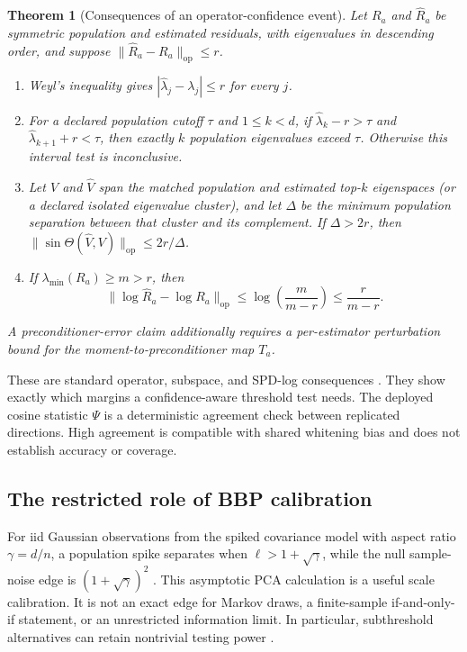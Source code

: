 \documentclass[11pt]{article}
\theoremstyle{plain}
\newtheorem{theorem}{Theorem}
\theoremstyle{definition}
\theoremstyle{remark}
\newcommand{\op}{\mathrm{op}}
\begin{document}
\begin{theorem}[Consequences of an operator-confidence event]\label{thm:operator}
Let $R_a$ and $\widehat R_a$ be symmetric population and estimated residuals,
with eigenvalues in descending order, and suppose
$\|\widehat R_a-R_a\|_{\op}\le r$.
\begin{enumerate}
\item Weyl's inequality gives
  $|\widehat\lambda_j-\lambda_j|\le r$ for every $j$.
\item For a declared population cutoff $\tau$ and $1\le k<d$, if
  $\widehat\lambda_k-r>\tau$ and
  $\widehat\lambda_{k+1}+r<\tau$, then exactly $k$ population eigenvalues
  exceed $\tau$. Otherwise this interval test is inconclusive.
\item Let $V$ and $\widehat V$ span the matched population and estimated top-$k$
  eigenspaces (or a declared isolated eigenvalue cluster), and let $\Delta$ be
  the minimum population separation between that cluster and its complement.
  If $\Delta>2r$, then
  $\|\sin\Theta(\widehat V,V)\|_{\op}\le2r/\Delta$.
\item If $\lambda_{\min}(R_a)\ge m>r$, then
  \[
    \|\log\widehat R_a-\log R_a\|_{\op}
       \le \log\!\left(\frac m{m-r}\right)\le\frac r{m-r}.
  \]
\end{enumerate}
A preconditioner-error claim additionally requires a per-estimator
perturbation bound for the moment-to-preconditioner map $T_a$.
\end{theorem}

These are standard operator, subspace, and SPD-log consequences
\citep{bhatia1997matrix,yu2015useful,higham2008functions}. They show exactly
which margins a confidence-aware threshold test needs. The deployed cosine
statistic $\Psi$ is a deterministic agreement check between replicated
directions. High agreement is compatible with shared whitening bias and does
not establish accuracy or coverage.

\subsection{The restricted role of BBP calibration}

For iid Gaussian observations from the spiked covariance model with aspect
ratio $\gamma=d/n$, a population spike separates when
$\ell>1+\sqrt\gamma$, while the null sample-noise edge is
$(1+\sqrt\gamma)^2$ \citep{baik2005phase,baik2006eigenvalues,paul2007asymptotics}.
This asymptotic PCA calculation is a useful scale calibration. It is not an
exact edge for Markov draws, a finite-sample if-and-only-if statement, or an
unrestricted information limit. In particular, subthreshold alternatives can
retain nontrivial testing power \citep{onatski2013asymptotic}.
\end{document}
